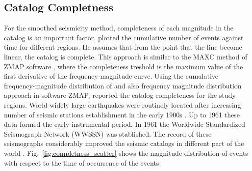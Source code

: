 
\subsection{Catalog Completness}

For the smoothed seismicity method, completeness of each magnitude in the catalog is an important factor.  \citet{Frankel1995} plotted the cumulative number of events against time for different regions. He assumes that from the point that the line become linear, the catalog is complete. This approach is similar to the MAXC method of ZMAP software \citep{Wiemer2001}, where the completeness treshold is the maximum value of the first derivative of the frequency-magnitude curve. Using the cumulative frequency-magnitude distribution of \citet{Gutenberg1944} and also frequency magnitude distribution approach in software ZMAP, \citet{Zare2014} reported the catalog completeness for the study regions. World widely large earthquakes were routinely located after increasing number of seismic stations establishment in the early 1900s \citep{Shearer2009}. Up to 1961 these data formed the early instrumental period. In 1961 the Worldwide Standardized Seismograph Network (WWSSN) was stablished. The record of these seismographs considerably improved the seismic catalogs in different part of the world \citep{Shearer2009}. Fig.~\ref{fig:completness_scatter} shows the magnitude distribution of events with respect to the time of occurrence of the events.

